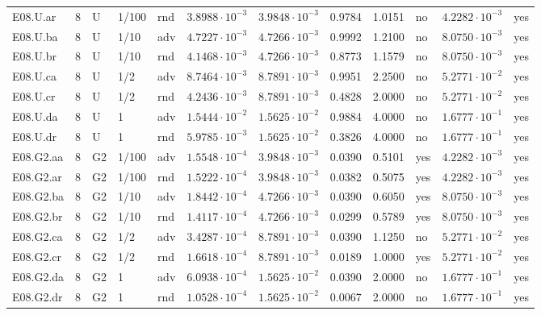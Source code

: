 {\begin{longtable}{@{}lllllllllll l@{}}
E08.U.ar & 8 & U & 1/100 & rnd & $3.8988\cdot 10^{-3}$ & $3.9848\cdot 10^{-3}$ & 0.9784 & 1.0151 & no & $4.2282\cdot 10^{-3}$ & yes \\
E08.U.ba & 8 & U & 1/10 & adv & $4.7227\cdot 10^{-3}$ & $4.7266\cdot 10^{-3}$ & 0.9992 & 1.2100 & no & $8.0750\cdot 10^{-3}$ & yes \\
E08.U.br & 8 & U & 1/10 & rnd & $4.1468\cdot 10^{-3}$ & $4.7266\cdot 10^{-3}$ & 0.8773 & 1.1579 & no & $8.0750\cdot 10^{-3}$ & yes \\
E08.U.ca & 8 & U & 1/2 & adv & $8.7464\cdot 10^{-3}$ & $8.7891\cdot 10^{-3}$ & 0.9951 & 2.2500 & no & $5.2771\cdot 10^{-2}$ & yes \\
E08.U.cr & 8 & U & 1/2 & rnd & $4.2436\cdot 10^{-3}$ & $8.7891\cdot 10^{-3}$ & 0.4828 & 2.0000 & no & $5.2771\cdot 10^{-2}$ & yes \\
E08.U.da & 8 & U & 1 & adv & $1.5444\cdot 10^{-2}$ & $1.5625\cdot 10^{-2}$ & 0.9884 & 4.0000 & no & $1.6777\cdot 10^{-1}$ & yes \\
E08.U.dr & 8 & U & 1 & rnd & $5.9785\cdot 10^{-3}$ & $1.5625\cdot 10^{-2}$ & 0.3826 & 4.0000 & no & $1.6777\cdot 10^{-1}$ & yes \\
E08.G2.aa & 8 & G2 & 1/100 & adv & $1.5548\cdot 10^{-4}$ & $3.9848\cdot 10^{-3}$ & 0.0390 & 0.5101 & yes & $4.2282\cdot 10^{-3}$ & yes \\
E08.G2.ar & 8 & G2 & 1/100 & rnd & $1.5222\cdot 10^{-4}$ & $3.9848\cdot 10^{-3}$ & 0.0382 & 0.5075 & yes & $4.2282\cdot 10^{-3}$ & yes \\
E08.G2.ba & 8 & G2 & 1/10 & adv & $1.8442\cdot 10^{-4}$ & $4.7266\cdot 10^{-3}$ & 0.0390 & 0.6050 & yes & $8.0750\cdot 10^{-3}$ & yes \\
E08.G2.br & 8 & G2 & 1/10 & rnd & $1.4117\cdot 10^{-4}$ & $4.7266\cdot 10^{-3}$ & 0.0299 & 0.5789 & yes & $8.0750\cdot 10^{-3}$ & yes \\
E08.G2.ca & 8 & G2 & 1/2 & adv & $3.4287\cdot 10^{-4}$ & $8.7891\cdot 10^{-3}$ & 0.0390 & 1.1250 & no & $5.2771\cdot 10^{-2}$ & yes \\
E08.G2.cr & 8 & G2 & 1/2 & rnd & $1.6618\cdot 10^{-4}$ & $8.7891\cdot 10^{-3}$ & 0.0189 & 1.0000 & yes & $5.2771\cdot 10^{-2}$ & yes \\
E08.G2.da & 8 & G2 & 1 & adv & $6.0938\cdot 10^{-4}$ & $1.5625\cdot 10^{-2}$ & 0.0390 & 2.0000 & no & $1.6777\cdot 10^{-1}$ & yes \\
E08.G2.dr & 8 & G2 & 1 & rnd & $1.0528\cdot 10^{-4}$ & $1.5625\cdot 10^{-2}$ & 0.0067 & 2.0000 & no & $1.6777\cdot 10^{-1}$ & yes \\

\end{longtable}}
